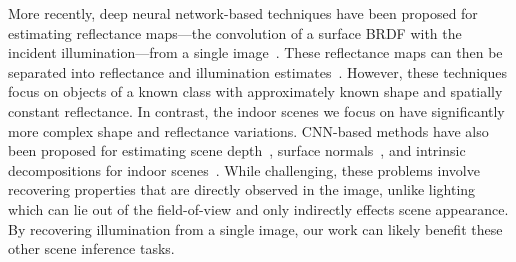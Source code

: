 More recently, deep neural network-based techniques have been proposed for estimating reflectance maps---the convolution of a surface BRDF with the incident illumination---from a single image~\cite{rematas-cvpr-16}. These reflectance maps can then be separated into reflectance and illumination estimates~\cite{georgoulis-arxiv-16a}. However, these techniques focus on objects of a known class with approximately known shape and spatially constant reflectance. In contrast, the indoor scenes we focus on have significantly more complex shape and reflectance variations. CNN-based methods have also been proposed for estimating scene depth~\cite{eigen-iccv-15}, surface normals~\cite{eigen-iccv-15,bansal2016marr}, and intrinsic decompositions for indoor scenes~\cite{zhou2015intrinsic}. While challenging, these problems involve recovering properties that are directly observed in the image, unlike lighting which can lie out of the field-of-view and only indirectly effects scene appearance. By recovering illumination from a single image, our work can likely benefit these other scene inference tasks.


